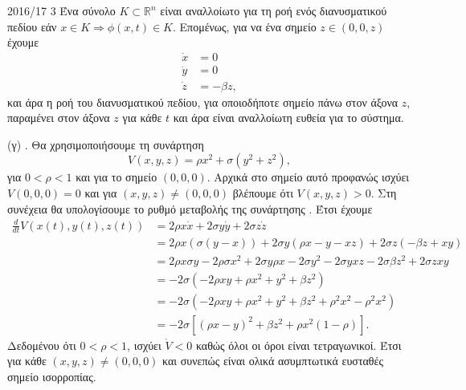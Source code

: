 \begin{solution}{2016/17 3}
    Ένα σύνολο \( K \subset \mathbb{R}^n \) είναι αναλλοίωτο για τη ροή ενός
    διανυσματικού πεδίου εάν \( x \in K \Rightarrow \phi(x, t) \in K \).
    Επομένως, για να ένα σημείο \( z \in (0, 0, z) \) έχουμε
    \begin{align*}
        \dot{x} &= 0 \\
        \dot{y} &= 0 \\
        \dot{z} &= -\beta z,
    \end{align*}
    και άρα η ροή του διανυσματικού πεδίου, για οποιοδήποτε σημείο πάνω στον
    άξονα \( z \), παραμένει στον άξονα \( z \) για κάθε \( t \) και άρα είναι
    αναλλοίωτη ευθεία για το σύστημα.

    (γ) . Θα χρησιμοποιήσουμε τη συνάρτηση 
    \begin{equation*}
        V(x, y, z) = \rho x^2 + \sigma(y^2 + z^2),
    \end{equation*}
    για \( 0 < \rho < 1 \) και για το σημείο \( (0, 0, 0) \). Αρχικά στο σημείο
    αυτό προφανώς ισχύει \( V(0, 0, 0) = 0 \) και για \( (x, y, z) \neq (0, 0,
    0) \) βλέπουμε ότι \( V(x, y, z) > 0 \). Στη συνέχεια θα υπολογίσουμε το
    ρυθμό μεταβολής της συνάρτησης . Έτσι έχουμε
    \begin{align*}
        \frac{d}{dt}V(x(t), y(t), z(t))
        &= 2\rho x \dot{x} + 2\sigma y \dot{y} + 2 \sigma z \dot{z} \\
        &= 2\rho x (\sigma(y - x)) + 2\sigma y (\rho x - y - xz) + 2 \sigma z
        (-\beta z + xy) \\
        &= 2\rho x\sigma y - 2\rho\sigma x^2 + 2\sigma y\rho x - 2\sigma y^2 -
        2\sigma yxz - 2 \sigma\beta z^2 + 2\sigma zxy \\
        &= -2\sigma \left( -2\rho xy + \rho x^2 + y^2 + \beta z^2 \right) \\
        &= -2\sigma \left( -2\rho xy + \rho x^2 + y^2 + \beta z^2 + \rho^2 x^2 -
        \rho^2x^2\right) \\
        &= -2\sigma \left[ {(\rho x - y)}^2 + \beta z^2 + \rho x^2(1 -
        \rho)\right].
    \end{align*}
    Δεδομένου ότι \( 0 < \rho < 1 \), ισχύει \( \dot{V} < 0 \) καθώς όλοι οι
    όροι είναι τετραγωνικοί. Έτσι για κάθε \( (x, y, z) \neq (0, 0, 0) \) και
    συνεπώς είναι ολικά ασυμπτωτικά ευσταθές σημείο ισορροπίας.
\end{solution}
